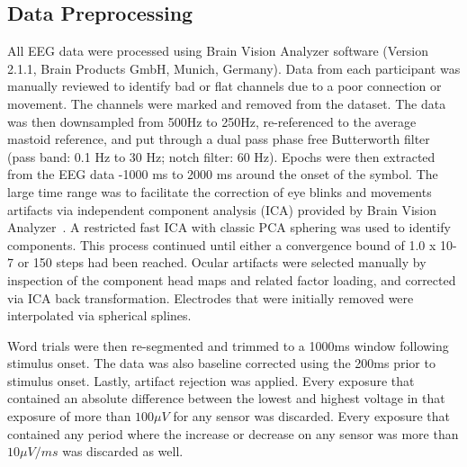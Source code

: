 \subsection{Data Preprocessing}
\label{sec:preprocessing}
All EEG data were processed using Brain Vision Analyzer software (Version 2.1.1, Brain Products GmbH, Munich, Germany). Data from each participant was manually reviewed to identify bad or flat channels due to a poor connection or movement. The channels were marked and removed from the dataset. The data was then downsampled from 500Hz to 250Hz, re-referenced to the average mastoid reference, and put through a dual pass phase free Butterworth filter (pass band: 0.1 Hz to 30 Hz; notch filter: 60 Hz). Epochs were then extracted from the EEG data -1000 ms to 2000 ms around the onset of the symbol. The large time range was to facilitate the correction of eye blinks and movements artifacts via independent component analysis (ICA) provided by Brain Vision Analyzer~\cite{luck2014introduction}. A restricted fast ICA with classic PCA sphering was used to identify components. This process continued until either a convergence bound of 1.0 x 10-7 or 150 steps had been reached. Ocular artifacts were selected manually by inspection of the component head maps and related factor loading, and corrected via ICA back transformation. Electrodes that were initially removed were interpolated via spherical splines. 
  
Word trials were then re-segmented and trimmed to a 1000ms window following stimulus onset. The data was also baseline corrected using the 200ms prior to stimulus onset. Lastly, artifact rejection was applied. Every exposure that contained an absolute difference between the lowest and highest voltage in that exposure of more than $100{\mu}V$ for any sensor was discarded. Every exposure that contained any period where the increase or decrease on any sensor was more than $10{\mu}V/ms$ was discarded as well.
